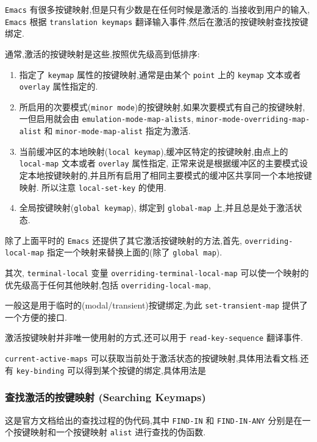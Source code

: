 \documentclass[11pt]{article}
\begin{document}
\texttt{Emacs} 有很多按键映射,但是只有少数是在任何时候是激活的.当接收到用户的输入, \texttt{Emacs} 根据 \texttt{translation keymaps} 翻译输入事件,然后在激活的按键映射查找按键绑定.

通常,激活的按键映射是这些,按照优先级高到低排序:

\begin{enumerate}
\item 指定了 \texttt{keymap} 属性的按键映射,通常是由某个 \texttt{point} 上的 \texttt{keymap} 文本或者 \texttt{overlay} 属性指定的.
\item 所启用的次要模式(\texttt{minor mode})的按键映射,如果次要模式有自己的按键映射,
一但启用就会由 \texttt{emulation-mode-map-alists}, \texttt{minor-mode-overriding-map-alist} 和 \texttt{minor-mode-map-alist} 指定为激活.
\item 当前缓冲区的本地映射(\texttt{local keymap}),缓冲区特定的按键映射,由点上的 \texttt{local-map} 文本或者 \texttt{overlay} 属性指定,
正常来说是根据缓冲区的主要模式设定本地按键映射的,并且所有启用了相同主要模式的缓冲区共享同一个本地按键映射.
所以注意 \texttt{local-set-key} 的使用.
\item 全局按键映射(\texttt{global keymap}), 绑定到 \texttt{global-map} 上,并且总是处于激活状态.
\end{enumerate}

除了上面平时的 \texttt{Emacs} 还提供了其它激活按键映射的方法,首先, \texttt{overriding-local-map} 指定一个映射来替换上面的(除了 \texttt{global map}).

其次, \texttt{terminal-local} 变量 \texttt{overriding-terminal-local-map} 可以使一个映射的优先级高于任何其他映射,包括 \texttt{overriding-local-map},

一般这是用于临时的(modal/transient)按键绑定,为此 \texttt{set-transient-map} 提供了一个方便的接口.

激活按键映射并非唯一使用射的方式,还可以用于 \texttt{read-key-sequence} 翻译事件.

\texttt{current-active-maps} 可以获取当前处于激活状态的按键映射,具体用法看文档.还有 \texttt{key-binding} 可以得到某个按键的绑定,具体用法是


\subsubsection{查找激活的按键映射 (Searching Keymaps)}
\label{sec:orgb964afa}

这是官方文档给出的查找过程的伪代码,其中 \texttt{FIND-IN} 和 \texttt{FIND-IN-ANY} 分别是在一个按键映射和一个按键映射 \texttt{alist} 进行查找的伪函数.
\end{document}
